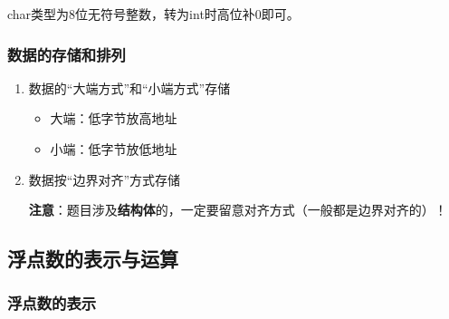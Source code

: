 \documentclass[12pt, a4paper, oneside]{ctexart}
\begin{document}
char类型为8位无符号整数，转为int时高位补0即可。

\subsubsection{数据的存储和排列}

\begin{enumerate}
  \item {\kaishu 数据的“大端方式”和“小端方式”存储}
  \begin{itemize}
    \item 大端：低字节放高地址
    \item 小端：低字节放低地址
  \end{itemize}
  \item {\kaishu 数据按“边界对齐”方式存储}
  
  \textbf{注意}：题目涉及\textbf{结构体}的，一定要留意对齐方式（一般都是边界对齐的）！
\end{enumerate}

\subsection{浮点数的表示与运算}

\subsubsection{浮点数的表示}
\end{document}
